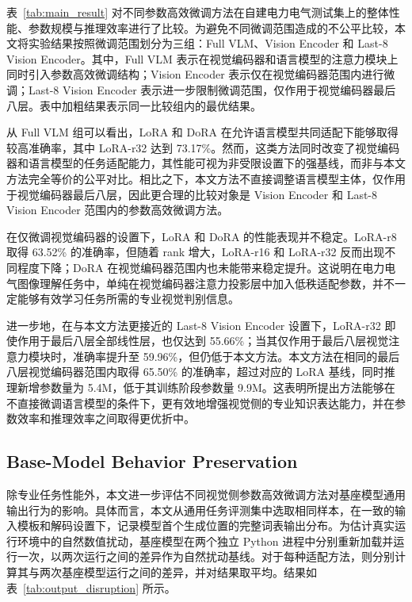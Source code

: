 \documentclass[journal]{IEEEtran}
\begin{document}
表~\ref{tab:main_result} 对不同参数高效微调方法在自建电力电气测试集上的整体性能、参数规模与推理效率进行了比较。为避免不同微调范围造成的不公平比较，本文将实验结果按照微调范围划分为三组：Full VLM、Vision Encoder 和 Last-8 Vision Encoder。其中，Full VLM 表示在视觉编码器和语言模型的注意力模块上同时引入参数高效微调结构；Vision Encoder 表示仅在视觉编码器范围内进行微调；Last-8 Vision Encoder 表示进一步限制微调范围，仅作用于视觉编码器最后八层。表中加粗结果表示同一比较组内的最优结果。

从 Full VLM 组可以看出，LoRA 和 DoRA 在允许语言模型共同适配下能够取得较高准确率，其中 LoRA-r32 达到 73.17\%。然而，这类方法同时改变了视觉编码器和语言模型的任务适配能力，其性能可视为非受限设置下的强基线，而非与本文方法完全等价的公平对比。相比之下，本文方法不直接调整语言模型主体，仅作用于视觉编码器最后八层，因此更合理的比较对象是 Vision Encoder 和 Last-8 Vision Encoder 范围内的参数高效微调方法。

在仅微调视觉编码器的设置下，LoRA 和 DoRA 的性能表现并不稳定。LoRA-r8 取得 63.52\% 的准确率，但随着 rank 增大，LoRA-r16 和 LoRA-r32 反而出现不同程度下降；DoRA 在视觉编码器范围内也未能带来稳定提升。这说明在电力电气图像理解任务中，单纯在视觉编码器注意力投影层中加入低秩适配参数，并不一定能够有效学习任务所需的专业视觉判别信息。

进一步地，在与本文方法更接近的 Last-8 Vision Encoder 设置下，LoRA-r32 即使作用于最后八层全部线性层，也仅达到 55.66\%；当其仅作用于最后八层视觉注意力模块时，准确率提升至 59.96\%，但仍低于本文方法。本文方法在相同的最后八层视觉编码器范围内取得 65.50\% 的准确率，超过对应的 LoRA 基线，同时推理新增参数量为 5.4M，低于其训练阶段参数量 9.9M。这表明所提出方法能够在不直接微调语言模型的条件下，更有效地增强视觉侧的专业知识表达能力，并在参数效率和推理效率之间取得更优折中。

\subsection{Base-Model Behavior Preservation}

除专业任务性能外，本文进一步评估不同视觉侧参数高效微调方法对基座模型通用输出行为的影响。具体而言，本文从通用任务评测集中选取相同样本，在一致的输入模板和解码设置下，记录模型首个生成位置的完整词表输出分布。为估计真实运行环境中的自然数值扰动，基座模型在两个独立 Python 进程中分别重新加载并运行一次，以两次运行之间的差异作为自然扰动基线。对于每种适配方法，则分别计算其与两次基座模型运行之间的差异，并对结果取平均。结果如表~\ref{tab:output_disruption} 所示。
\end{document}
